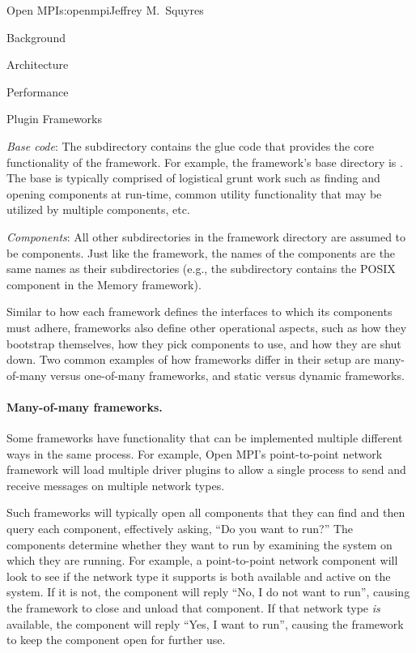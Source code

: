\begin{aosachapter}{Open MPI}{s:openmpi}{Jeffrey M.\ Squyres}
\begin{aosasect1}{Background}
\begin{aosasect1}{Architecture}
\begin{aosasect2}{Performance}
\begin{aosasect2}{Plugin Frameworks}
\begin{aosaenumerate}
\item \emph{Base code}: The  subdirectory contains the glue
  code that provides the core functionality of the framework.  For
  example, the  framework's base directory is .  
  The base is typically comprised of logistical grunt
  work such as finding and opening components at run-time, common
  utility functionality that may be utilized by multiple components,
  etc.

\item \emph{Components}: All other subdirectories in the framework
  directory are assumed to be components.  Just like the framework,
  the names of the components are the same names as their
  subdirectories (e.g., the  subdirectory contains
  the POSIX component in the Memory framework).
\end{aosaenumerate}

Similar to how each framework defines the interfaces to which its
components must adhere, frameworks also define other operational
aspects, such as how they bootstrap themselves, how they pick
components to use, and how they are shut down.  Two common examples of
how frameworks differ in their setup are many-of-many versus one-of-many
frameworks, and static versus dynamic frameworks.


\paragraph{Many-of-many frameworks.} 

Some frameworks have functionality that can be implemented multiple
different ways in the same process.
%
For example, Open MPI's point-to-point network framework will load
multiple driver plugins to allow a single process to send and receive
messages on multiple network types.

Such frameworks will typically open all components that they can find
and then query each component, effectively asking, ``Do you want to
run?''  
%
The components determine whether they want to run by examining the
system on which they are running.
%
For example, a point-to-point network component will look to see if
the network type it supports is both available and active on the
system.
%
If it is not, the component will reply ``No, I do not want to run'',
causing the framework to close and unload that component.
% 
If that network type \emph{is} available, the component will reply
``Yes, I want to run'', causing the framework to keep the component
open for further use.


\end{aosasect2}
\end{aosasect2}
\end{aosasect1}
\end{aosasect1}
\end{aosachapter}
